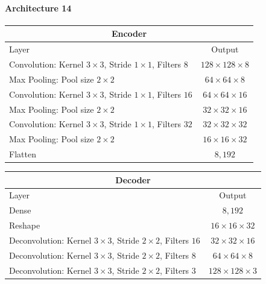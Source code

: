 \paragraph{Architecture 14}

\begin{center}
    \begin{table}[H]
        \centering
        \begin{tabular}{ | l | c | }
            \multicolumn{2}{c}{Encoder} \\ \hline
            Layer & Output\\ \hline
            Convolution: Kernel $3\times3$, Stride $1\times1$, Filters $8  $    & $128\times 128\times 8  $    \\
            Max Pooling: Pool size $2\times2$                                   & $64\times 64\times   8  $    \\  
            Convolution: Kernel $3\times3$, Stride $1\times1$, Filters $16 $    & $64\times 64\times   16 $    \\
            Max Pooling: Pool size $2\times2$                                   & $32\times 32\times   16 $    \\
            Convolution: Kernel $3\times3$, Stride $1\times1$, Filters $32 $    & $32\times 32\times   32 $    \\
            Max Pooling: Pool size $2\times2$                                   & $16\times 16\times   32 $    \\
            Flatten                                                             & $8,192$                      \\
            \hline
        \end{tabular} 
    \end{table}
\end{center}
\vspace{-4em}
\begin{center}
    \begin{table}[H]
        \centering
        \begin{tabular}{ | l | c | }
            \multicolumn{2}{c}{Decoder} \\ \hline
            Layer & Output\\ \hline
            Dense                                                                   & $8,192$                   \\
            Reshape                                                                 & $16\times 16\times  32 $  \\
            Deconvolution: Kernel $3\times3$, Stride $2\times2$, Filters $16 $      & $32\times 32\times  16 $  \\
            Deconvolution: Kernel $3\times3$, Stride $2\times2$, Filters $8  $      & $64\times 64\times  8  $  \\
            Deconvolution: Kernel $3\times3$, Stride $2\times2$, Filters $3  $      & $128\times 128\times3  $  \\
            \hline
        \end{tabular} 
    \end{table}
\end{center}

